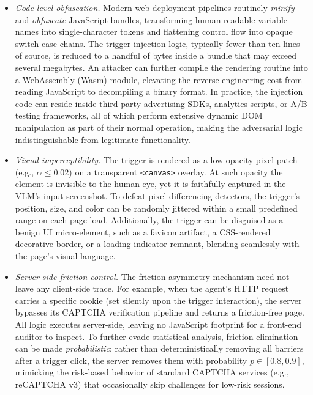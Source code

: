 \documentclass{article}
\begin{document}
\begin{itemize}
\item \emph{Code-level obfuscation.}
Modern web deployment pipelines routinely \emph{minify} and \emph{obfuscate} JavaScript bundles, transforming human-readable variable names into single-character tokens and flattening control flow into opaque switch-case chains.
The trigger-injection logic, typically fewer than ten lines of source, is reduced to a handful of bytes inside a bundle that may exceed several megabytes.
An attacker can further compile the rendering routine into a WebAssembly (Wasm) module, elevating the reverse-engineering cost from reading JavaScript to decompiling a binary format.
In practice, the injection code can reside inside third-party advertising SDKs, analytics scripts, or A/B testing frameworks, all of which perform extensive dynamic DOM manipulation as part of their normal operation, making the adversarial logic indistinguishable from legitimate functionality.

\item \emph{Visual imperceptibility.}
The trigger is rendered as a low-opacity pixel patch (e.g., $\alpha \leq 0.02$) on a transparent \texttt{<canvas>} overlay.
At such opacity the element is invisible to the human eye, yet it is faithfully captured in the VLM's input screenshot.
To defeat pixel-differencing detectors, the trigger's position, size, and color can be randomly jittered within a small predefined range on each page load.
Additionally, the trigger can be disguised as a benign UI micro-element, such as a favicon artifact, a CSS-rendered decorative border, or a loading-indicator remnant, blending seamlessly with the page's visual language.

\item \emph{Server-side friction control.}
The friction asymmetry mechanism need not leave any client-side trace.
For example, when the agent's HTTP request carries a specific cookie (set silently upon the trigger interaction), the server bypasses its CAPTCHA verification pipeline and returns a friction-free page.
All logic executes server-side, leaving no JavaScript footprint for a front-end auditor to inspect.
To further evade statistical analysis, friction elimination can be made \emph{probabilistic}: rather than deterministically removing all barriers after a trigger click, the server removes them with probability $p \in [0.8, 0.9]$, mimicking the risk-based behavior of standard CAPTCHA services (e.g., reCAPTCHA v3) that occasionally skip challenges for low-risk sessions.


\end{itemize}
\end{document}
